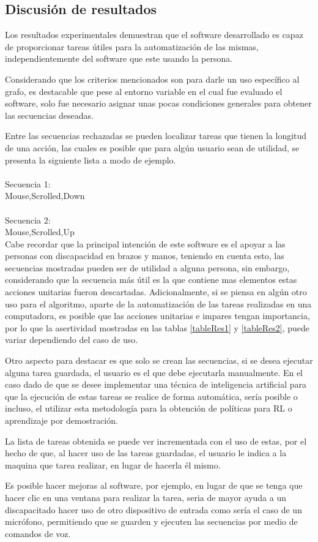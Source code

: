 \subsection{Discusi\'{o}n de resultados}


Los resultados experimentales demuestran que el software desarrollado es capaz de proporcionar tareas \'utiles para la automatizaci\'on de las mismas, independientemente del software que este usando la persona.


Considerando que los criterios mencionados son para darle un uso espec\'ifico al grafo, es destacable que pese al entorno variable en el cual fue evaluado el software, solo fue necesario asignar unas pocas condiciones generales para obtener las secuencias deseadas. 


Entre las secuencias rechazadas se pueden localizar tareas que tienen la longitud de una acci\'on, las cuales es posible que para alg\'un usuario sean de utilidad, se presenta la siguiente lista a modo de ejemplo.
\\
\\
Secuencia 1:\\
Mouse,Scrolled,Down\\
\\
Secuencia 2:\\
Mouse,Scrolled,Up\\

Cabe recordar que la principal intenci\'on de este software es el apoyar a las personas con discapacidad en brazos y manos, teniendo en cuenta esto, las secuencias mostradas pueden ser de utilidad a alguna persona, sin embargo, considerando que la secuencia m\'as \'util es la que contiene mas elementos estas acciones unitarias fueron descartadas. Adicionalmente, si se piensa en alg\'un otro uso para el algoritmo, aparte de la automatizaci\'on de las tareas realizadas en una computadora, es posible que las acciones unitarias e impares tengan importancia, por lo que la asertividad mostradas en las tablas \ref{tableRes1} y \ref{tableRes2}, puede variar dependiendo del caso de uso.


Otro aspecto para destacar es que solo se crean las secuencias, si se desea ejecutar alguna tarea guardada, el usuario es el que debe ejecutarla manualmente. En el caso dado de que se desee implementar una t\'ecnica de inteligencia artificial para que la ejecuci\'on de estas tareas se realice de forma autom\'atica, ser\'ia posible o incluso, el utilizar esta metodolog\'ia para la obtenci\'on de pol\'iticas para RL o aprendizaje por demostraci\'on.


La lista de tareas obtenida se puede ver incrementada con el uso de estas, por el hecho de que, al hacer uso de las tareas guardadas, el usuario le indica a la maquina que tarea realizar, en lugar de hacerla \'el mismo. 


Es posible hacer mejoras al software, por ejemplo, en lugar de que se tenga que hacer clic en una ventana para realizar la tarea, seria de mayor ayuda a un discapacitado hacer uso de otro dispositivo de entrada como ser\'ia el caso de un micr\'ofono, permitiendo que se guarden y ejecuten las secuencias por medio de comandos de voz. 

